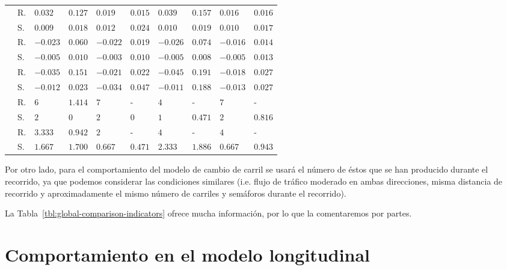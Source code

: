 \begin{table*}[!b]
\begin{tabularx}{\linewidth}{cYYYYYYYYY}
		   & R. & $0.032$  & $0.127$  & $0.019$  & $0.015$  & $0.039$  & $0.157$  & $0.016$  & $0.016$  \\
		& S. & $0.009$  & $0.018$  & $0.012$  & $0.024$  & $0.010$  & $0.019$  & $0.010$  & $0.017$  \\
		   & R. & $-0.023$ & $0.060$  & $-0.022$ & $0.019$  & $-0.026$ & $0.074$  & $-0.016$ & $0.014$  \\
		& S. & $-0.005$ & $0.010$  & $-0.003$ & $0.010$  & $-0.005$ & $0.008$  & $-0.005$ & $0.013$  \\
		   & R. & $-0.035$ & $0.151$  & $-0.021$ & $0.022$  & $-0.045$ & $0.191$  & $-0.018$ & $0.027$  \\
		& S. & $-0.012$ & $0.023$  & $-0.034$ & $0.047$  & $-0.011$ & $0.188$  & $-0.013$ & $0.027$  \\
		    & R. & $6$     & $1.414$ & $7$     &  -      & $4$     &    -    & $7$     & -       \\
		                                                                      & S. & $2$     & $0$     & $2$     & $0$     & $1$     & $0.471$ & $2$     & $0.816$ \\
		    & R. & $3.333$ & $0.942$ & $2$     &  -      & $4$     &    -    & $4$     &    -    \\
		                                                                      & S. & $1.667$ & $1.700$ & $0.667$ & $0.471$ & $2.333$ & $1.886$ & $0.667$ & $0.943$ \\
		\bottomrule
	\end{tabularx}
\end{table*}

Por otro lado, para el comportamiento del modelo de cambio de carril se usará el número de éstos que se han producido durante el recorrido, ya que podemos considerar las condiciones similares (i.e. flujo de tráfico moderado en ambas direcciones, misma distancia de recorrido y aproximadamente el mismo número de carriles y semáforos durante el recorrido).

La Tabla~\ref{tbl:global-comparison-indicators} ofrece mucha información, por lo que la comentaremos por partes.

\section{Comportamiento en el modelo longitudinal}

